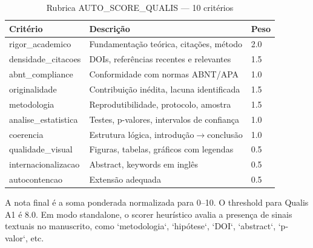 \begin{table}[H]
\centering
\caption{Rubrica AUTO\_SCORE\_QUALIS — 10 critérios}
\label{tab:rubric-qualis}
\begin{tabular}{@{}lll@{}}
\toprule
\textbf{Critério} & \textbf{Descrição} & \textbf{Peso} \\
\midrule
rigor\_academico & Fundamentação teórica, citações, método & 2.0 \\
densidade\_citacoes & DOIs, referências recentes e relevantes & 1.5 \\
abnt\_compliance & Conformidade com normas ABNT/APA & 1.0 \\
originalidade & Contribuição inédita, lacuna identificada & 1.5 \\
metodologia & Reprodutibilidade, protocolo, amostra & 1.5 \\
analise\_estatistica & Testes, p-valores, intervalos de confiança & 1.0 \\
coerencia & Estrutura lógica, introdução$\to$conclusão & 1.0 \\
qualidade\_visual & Figuras, tabelas, gráficos com legendas & 0.5 \\
internacionalizacao & Abstract, keywords em inglês & 0.5 \\
autocontencao & Extensão adequada & 0.5 \\
\bottomrule
\end{tabular}
\end{table}

A nota final é a soma ponderada normalizada para 0--10. O threshold para Qualis A1 é 8.0. Em modo standalone, o scorer heurístico avalia a presença de sinais textuais no manuscrito, como `metodologia`, `hipótese`, `DOI`, `abstract`, `p-valor`, etc.


